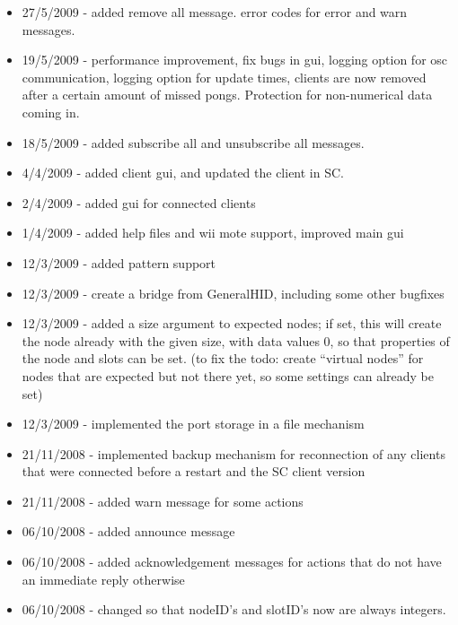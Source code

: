 \documentclass[letterpaper,10pt]{article}
\begin{document}
\begin{itemize}
 \item 27/5/2009 - added remove all message. error codes for error and warn messages.
 \item 19/5/2009 - performance improvement, fix bugs in gui, logging option for osc communication, logging option for update times, clients are now removed after a certain amount of missed pongs. Protection for non-numerical data coming in.
 \item 18/5/2009 - added subscribe all and unsubscribe all messages.
 \item 4/4/2009 - added client gui, and updated the client in SC.
 \item 2/4/2009 - added gui for connected clients
 \item 1/4/2009 - added help files and wii mote support, improved main gui
 \item 12/3/2009 - added pattern support
 \item 12/3/2009 - create a bridge from GeneralHID, including some other bugfixes
 \item 12/3/2009 - added a size argument to expected nodes; if set, this will create the node already with the given size, with data values 0, so that properties of the node and slots can be set. (to fix the todo: create ``virtual nodes'' for nodes that are expected but not there yet, so some settings can already be set)
 \item 12/3/2009 - implemented the port storage in a file mechanism
 \item 21/11/2008 - implemented backup mechanism for reconnection of any clients that were connected before a restart and the SC client version
 \item 21/11/2008 - added warn message for some actions
 \item 06/10/2008 - added announce message
 \item 06/10/2008 - added acknowledgement messages for actions that do not have an immediate reply otherwise
 \item 06/10/2008 - changed so that nodeID's and slotID's now are always integers.
\end{itemize}
\end{document}
